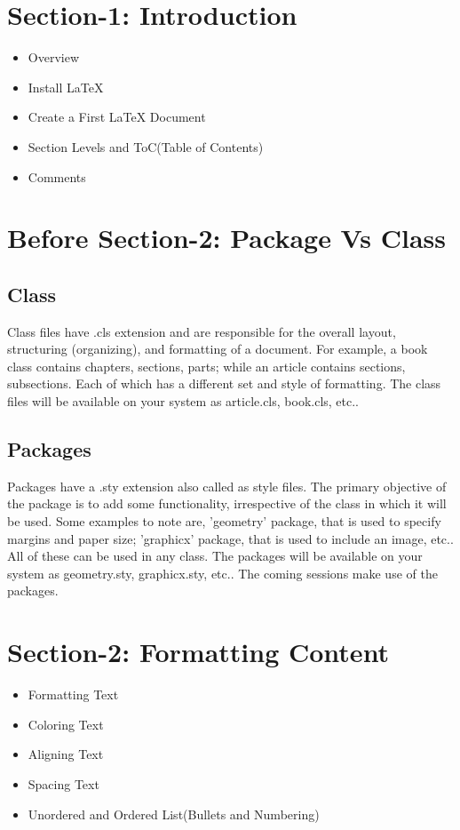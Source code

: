 \documentclass[a4paper, 12pt]{article}
\begin{document}
\section*{Section-1: Introduction} 
\begin{itemize}
	\item Overview 
	\item Install \LaTeX 
	\item Create a First {\LaTeX} Document 
	\item Section Levels and ToC(Table of Contents)
	\item Comments 
\end{itemize}


\section*{Before Section-2: Package Vs Class}
\subsection*{Class} 
Class files have .cls extension and are responsible for the overall layout, 
structuring (organizing), and formatting of a document. For example, a book 
class contains chapters, sections, parts; while an article contains sections, 
subsections. Each of which has a different set and style of formatting. The 
class files will be available on your system as article.cls, book.cls, etc..

\subsection*{Packages} 
Packages have a .sty extension also called as style files. The primary 
objective of the package is to add some functionality, irrespective of the 
class in which it will be used. Some examples to note are, 'geometry' package, 
that is used to specify margins and paper size; 'graphicx' package, that is 
used to include an image, etc.. All of these can be used in any class. The 
packages will be available on your system as geometry.sty, graphicx.sty, etc.. 
The coming sessions make use of the packages.


\section*{Section-2: Formatting Content} 
\begin{itemize}
	\item Formatting Text 
	\item Coloring Text   
	\item Aligning Text 
	\item Spacing Text 
	\item Unordered and Ordered List(Bullets and Numbering) 
\end{itemize}
\end{document}
